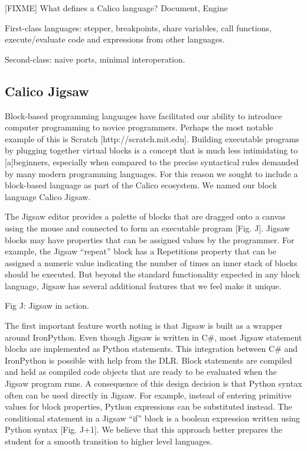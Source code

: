 \documentclass[preprint]{sigplanconf}
\begin{document}
[FIXME] What defines a Calico language? Document, Engine

First-class languages: stepper, breakpoints, share variables, call
functions, execute/evaluate code and expressions from other languages.

Second-class: naive ports, minimal interoperation.

\subsection{Calico Jigsaw}

Block-based programming languages have facilitated our ability to
introduce computer programming to novice programmers. Perhaps the most
notable example of this is Scratch [http://scratch.mit.edu]. Building
executable programs by plugging together virtual blocks is a concept
that is much less intimidating to [a]beginners, especially when
compared to the precise syntactical rules demanded by many modern
programming languages. For this reason we sought to include a
block-based language as part of the Calico ecosystem. We named our
block language Calico Jigsaw.

The Jigsaw editor provides a palette of blocks that are dragged onto a
canvas using the mouse and connected to form an executable program
[Fig. J]. Jigsaw blocks may have properties that can be assigned
values by the programmer. For example, the Jigsaw ``repeat'' block has
a Repetitions property that can be assigned a numeric value indicating
the number of times an inner stack of blocks should be executed. But
beyond the standard functionality expected in any block language,
Jigsaw has several additional features that we feel make it unique.


Fig J: Jigsaw in action.

The first important feature worth noting is that Jigsaw is built as a
wrapper around IronPython. Even though Jigsaw is written in C\#, most
Jigsaw statement blocks are implemented as Python statements. This
integration between C\# and IronPython is possible with help from the
DLR. Block statements are compiled and held as compiled code objects
that are ready to be evaluated when the Jigsaw program runs. A
consequence of this design decision is that Python syntax often can be
used directly in Jigsaw. For example, instead of entering primitive
values for block properties, Python expressions can be substituted
instead. The conditional statement in a Jigsaw ``if'' block is a
boolean expression written using Python syntax [Fig. J+1]. We believe
that this approach better prepares the student for a smooth transition
to higher level languages.
\end{document}
